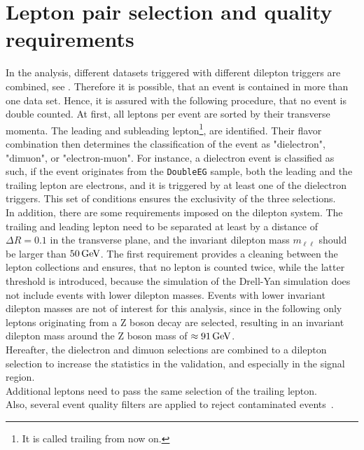 \section{Lepton pair selection and quality requirements}\label{sec:lepPair}
In the analysis, different datasets triggered with different dilepton triggers are combined, see . Therefore it is possible, that an event is contained in more than one data set. Hence, it is assured with the following procedure, that no event is double counted. At first, all leptons per event are sorted by their transverse momenta. The leading and subleading lepton\footnote{It is called trailing from now on.}, are identified. Their flavor combination then determines the classification of the event as "dielectron", "dimuon", or "electron-muon". For instance, a dielectron event is classified as such, if  the event originates from the \texttt{DoubleEG} sample, both the leading and the trailing lepton are electrons, and it is triggered by at least one of the dielectron triggers. This set of conditions ensures the exclusivity of the three selections.\\
In addition, there are some requirements imposed on the dilepton system. The trailing and leading lepton need to be separated at least by a distance of $\Delta R=0.1$ in the transverse plane, and the invariant dilepton mass $m_{\ell\ell}$ should be larger than $50\,\text{Ge\hspace{-.08em}V}$. The first requirement provides a cleaning between the lepton collections and ensures, that no lepton is counted twice, while the latter threshold is introduced, because the simulation of the Drell-Yan simulation does not include events with lower dilepton masses. Events with lower invariant dilepton masses are not of interest for this analysis, since in the following only leptons originating from a Z boson decay are selected, resulting in an invariant dilepton mass around the Z boson mass of $\approx91\,\text{Ge\hspace{-.08em}V}$.\\
Hereafter, the dielectron and dimuon selections are combined to a dilepton selection to increase the statistics in the validation, and especially in the signal region.\\
Additional leptons need to pass the same selection of the trailing lepton.
\\
Also, several event quality filters are applied to reject contaminated events~\cite{MetFilter}.
